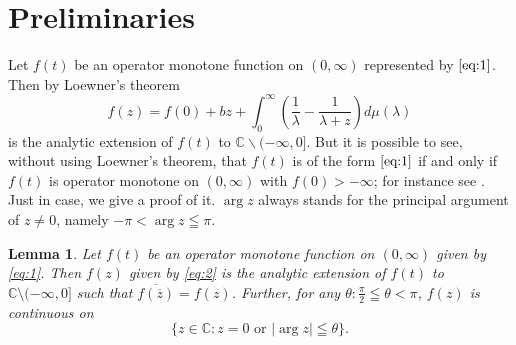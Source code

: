\documentclass[reqno]{amsart}
\newtheorem{lemma}[theorem]{Lemma}
\theoremstyle{definition}
\theoremstyle{remark}
\begin{document}
\section{Preliminaries}
Let $f(t)$ be an operator monotone function on $(0, \infty)$ represented by 
$\eqref{eq:1}$. Then by Loewner's theorem 
\begin{equation}
f(z) = f(0) + b z + \int_0^{\infty} (\frac{1}{\lambda} - \frac{1}{\lambda + z}) d\mu(\lambda) \label{eq:2}
\end{equation}
 is the analytic extension of $f(t)$ to $\mathbb{C} \smallsetminus (-\infty, 0]$. 
But it is possible to see, without using Loewner's theorem,  that $f(t)$ is of the 
form $\eqref{eq:1}$ if and only if 
$f(t)$ is operator monotone on $(0, \infty)$ with $f(0)>-\infty$; for instance see \cite{Hansen}. 
Just in case, we give a proof of it.
$\arg z$ always stands for the principal argument of $z\ne 0$, namely 
$-\pi < \arg z \leqq \pi$.
\begin{lemma}\label{Lem:2-1} Let $f(t)$ be an operator monotone function on $(0, \infty)$ given 
by \eqref{eq:1}. Then 
$f(z)$ given by \eqref{eq:2} is the analytic extension of $f(t)$ to 
$\mathbb{C}\setminus (-\infty, 0]$ such that $\overline{f(\overline{z})} = f(z)$.
 Further, 
for any $\theta: \frac{\pi}{2} \leqq \theta < \pi$, 
$f(z)$ is continuous 
on $$\{ z \in \mathbb{C}: z=0\,\, \text{or}\,\, |\arg z| \leqq \theta \}.$$
\end{lemma}
\end{document}
